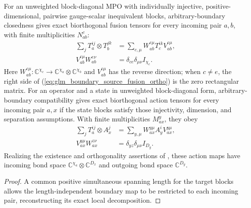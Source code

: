 \begin{lemma}
    \label{thm:glm_boundary_source_decomposition}
    \leanok
    For an unweighted block-diagonal MPO with individually injective,
    positive-dimensional, pairwise gauge-scalar inequivalent blocks,
    arbitrary-boundary closedness gives exact biorthogonal fusion tensors
    for every incoming pair $a,b$, with finite multiplicities $N_{ab}^c$:
    \begin{align}
        \sum_j T_a^{ij}\otimes T_b^{jk}
         & =\sum_{c,\mu}W_{ab}^{c\mu}T_c^{ik}V_{ab}^{c\mu},
        \label{eq:glm_boundary_source_fusion}               \\
        V_{ab}^{c\mu}W_{ab}^{e\nu}
         & =\delta_{ce}\delta_{\mu\nu}I_{\chi_c}.
        \label{eq:glm_boundary_source_fusion_ortho}
    \end{align}
    Here $W_{ab}^{c\mu}:\mathbb C^{\chi_c}\to
        \mathbb C^{\chi_a}\otimes\mathbb C^{\chi_b}$ and $V_{ab}^{c\mu}$ has the
    reverse direction; when $c\ne e$, the right side of
    (\ref{eq:glm_boundary_source_fusion_ortho}) is the zero rectangular matrix.
    For an operator and a state in unweighted
    block-diagonal form, arbitrary-boundary compatibility gives exact
    biorthogonal action tensors for every incoming pair $a,x$ if the state
    blocks satisfy those injectivity, dimension, and separation assumptions.
    With finite multiplicities $M_{ax}^y$, they obey
    \begin{align}
        \sum_j T_a^{ij}\otimes A_x^j
         & =\sum_{y,\mu}W_{ax}^{y\mu}A_y^iV_{ax}^{y\mu},
        \label{eq:glm_boundary_source_action}            \\
        V_{ax}^{y\mu}W_{ax}^{z\nu}
         & =\delta_{yz}\delta_{\mu\nu}I_{D_y}.
        \label{eq:glm_boundary_source_action_ortho}
    \end{align}
    Realizing the existence and orthogonality assertions of
    \cite[Appendix~A]{GarreRubio2023MPOSym}, these action maps have incoming
    bond space $\mathbb C^{\chi_a}\otimes\mathbb C^{D_x}$ and outgoing bond
    space $\mathbb C^{D_y}$.
\end{lemma}
\begin{proof}
    \leanok
    A common positive simultaneous spanning length for the target blocks
    allows the length-independent boundary map to be restricted to each
    incoming pair, reconstructing its exact local decomposition.
\end{proof}

